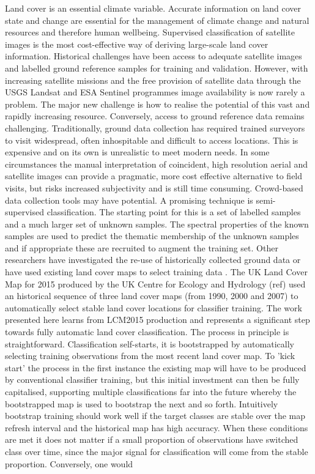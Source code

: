 Land cover is an essential climate variable\cite{bojinski2014concept,vargo2013importance}.  Accurate information on land cover state and change are essential for the management of climate change and natural resources and therefore human wellbeing\cite{alcock2015accounts,burkhard2009landscapes,koschke2012multi}. Supervised classification of satellite images is the most cost-effective way of deriving large-scale land cover information.  Historical challenges have been access to adequate satellite images and labelled ground reference samples for training and validation.  However, with increasing satellite missions and the free provision of satellite data through the USGS Landsat and ESA Sentinel programmes image availability is now rarely a problem.  The major new challenge is how to realise the potential of this vast and rapidly increasing resource.  Conversely, access to ground reference data remains challenging.  Traditionally, ground data collection has required trained surveyors to visit widespread, often inhospitable and difficult to access locations.  This is expensive and on its own is unrealistic to meet modern needs.  In some circumstances the manual interpretation of coincident, high resolution aerial and satellite images can provide a pragmatic, more cost effective alternative to field visits, but risks increased subjectivity and is still time consuming.  Crowd-based data collection tools may have potential\cite{laso2016crowdsourcing,comber2013using}.  A promising technique is semi-supervised classification\cite{maulik2011self,liu2013self}. The starting point for this is a set of labelled samples and a much larger set of unknown samples.  The spectral properties of the known samples are used to predict the thematic membership of the unknown samples and if appropriate these are recruited to augment the training set.  Other researchers have investigated the re-use of historically collected ground data \cite{inglada2017operational,tardy2017fusion} or have used existing land cover maps to select training data \cite{kim2017self}. The UK Land Cover Map for 2015 produced by the UK Centre for Ecology and Hydrology (ref) used an historical sequence of three land cover maps (from 1990, 2000 and 2007) to automatically select stable land cover locations for classifier training.  The work presented here learns from LCM2015 production and represents a significant step towards fully automatic land cover classification.  The process in principle is straightforward.  Classification self-starts, it is bootstrapped by automatically selecting training observations from the most recent land cover map.  To 'kick start' the process in the first instance the existing map will have to be produced by conventional classifier training, but this initial investment can then be fully capitalised, supporting multiple classifications far into the future whereby the bootstrapped map is used to bootstrap the next and so forth.  Intuitively bootstrap training should work well if the target classes are stable over the map refresh interval and the historical map has high accuracy.  When these conditions are met it does not matter if a small proportion of observations have switched class over time, since the major signal for classification will come from the stable proportion. Conversely, one would 